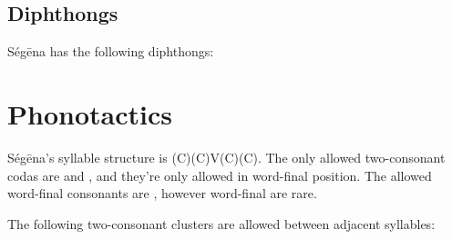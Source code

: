 \subsection{Diphthongs}

Ségēna has the following diphthongs:


\section{Phonotactics}

Ségēna's syllable structure is (C)(C)V(C)(C). The only allowed two-consonant
codas are  and , and they're only allowed in
word-final position. The allowed word-final consonants are , however word-final  are rare.

The following two-consonant clusters are allowed between adjacent syllables:

